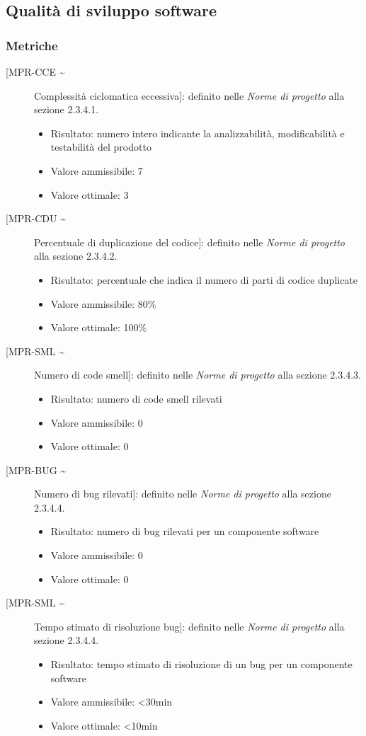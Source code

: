 \documentclass[../piano-di-qualifica.tex]{subfiles}
\begin{document}
\subsection{Qualità di sviluppo software}


\subsubsection{Metriche}%
\label{subsec:metriche_doc}

\begin{description}
  \item [[MPR-CCE \textasciitilde] Complessità ciclomatica eccessiva]: definito nelle \textit{Norme di progetto} alla sezione 2.3.4.1.
        \begin{itemize} \item Risultato: numero intero indicante la analizzabilità, modificabilità e testabilità del prodotto \item Valore ammissibile: \leq{}  7  \item Valore ottimale: \leq{}  3 \end{itemize}
  \item [[MPR-CDU \textasciitilde] Percentuale di duplicazione del codice]: definito nelle \textit{Norme di progetto} alla sezione 2.3.4.2.
        \begin{itemize} \item Risultato: percentuale che indica il numero di parti di codice duplicate \item Valore ammissibile: 80\% \item Valore ottimale: 100\% \end{itemize}
  \item [[MPR-SML \textasciitilde] Numero di code smell]: definito nelle \textit{Norme di progetto} alla sezione 2.3.4.3.
        \begin{itemize} \item Risultato: numero di code smell rilevati \item Valore ammissibile: 0 \item Valore ottimale: 0 \end{itemize}
  \item [[MPR-BUG \textasciitilde] Numero di bug rilevati]: definito nelle \textit{Norme di progetto} alla sezione 2.3.4.4.
        \begin{itemize} \item Risultato: numero di bug rilevati per un componente software \item Valore ammissibile: 0 \item Valore ottimale: 0 \end{itemize}
  \item [[MPR-SML \textasciitilde] Tempo stimato di risoluzione bug]: definito nelle \textit{Norme di progetto} alla sezione 2.3.4.4.
        \begin{itemize} \item Risultato: tempo stimato di risoluzione di un bug per un componente software \item Valore ammissibile: <30min \item Valore ottimale: <10min \end{itemize}
\end{description}
\end{document}
